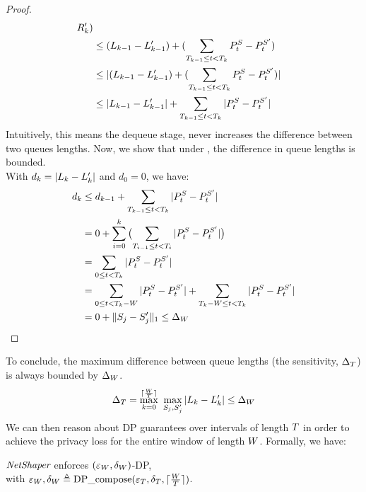 \begin{proof}
\begin{align*}
    {R}_{k}')
    \\
    & \leq
    (L_{k-1} - L_{k-1}')
    +
    (\sum_{T_{k-1} \leq t < T_{k}}P^S_t - P^{S'}_t)
    \\
    & \leq
    |
    (L_{k-1} - L_{k-1}')
    +
    (\sum_{T_{k-1} \leq t < T_{k}}P^S_t - P^{S'}_t)
    |
    \\
    & \leq
    |L_{k-1} - L_{k-1}'|
    +
    \sum_{T_{k-1} \leq t < T_{k}}|P^S_t - P^{S'}_t|
    \end{align*}
    Intuitively, this means the dequeue stage, never increases the difference
    between two queues lengths.
    Now, we show that under , the difference in queue lengths is bounded.
    \\
    With $d_k = |L_{k}-L_{k}'|$ and $d_0 = 0$, we have:
    \begin{align}
    \nonumber
    & d_k \leq d_{k-1} + \sum_{T_{k-1} \leq t < T_{k}}|P^S_t - P^{S'}_t|\\
    &~~~=
    \nonumber
    0 + \sum_{i=0}^{k}\big({\sum_{T_{i-1} \leq t < T_{i}}|P^S_t - P^{S'}_t|}\big)\\
    &~~~=
    \nonumber
    \sum_{0 \leq t < T_{k}} |P^S_t - P^{S'}_t|\\
    \nonumber
    &~~~= \sum_{0 \leq t < T_k - W} |P^S_t - P^{S'}_t| +
    \sum_{T_{k} - W \leq t < T_{k}} |P^S_t - P^{S'}_t|\\
    \nonumber
    &~~~=
    0 + \|S_{j} - S_{j}'\|_1
    \leq
    \Delta_{W}
    \end{align}
\end{proof}
\noindent To conclude, the maximum difference between queue lengths (\ie the sensitivity,
$\Delta_T$) is always bounded by $\Delta_{W}$.
\begin{align}
        \Delta_T = \max_{k = 0}^{\lceil \frac{W}{T} \rceil}~\max_{S_{j},
        S_{j}'} | L_{k} - L_{k}' | \leq \Delta_{W}
\end{align}
We can then reason about DP guarantees over intervals of length $T$ in
order to achieve the privacy loss for the entire window of length $W$.
%
Formally, we have:
\begin{proposition}\label{prop:dp}
    {$\textit{NetShaper}$} enforces $(\varepsilon_{W}, \delta_{W})$-DP, 
    \\ 
    with $\varepsilon_{W}, \delta_{W} \triangleq
    \textrm{DP\_compose}(\varepsilon_T, \delta_T, \lceil \frac{W}{T} \rceil)$.
\end{proposition}
